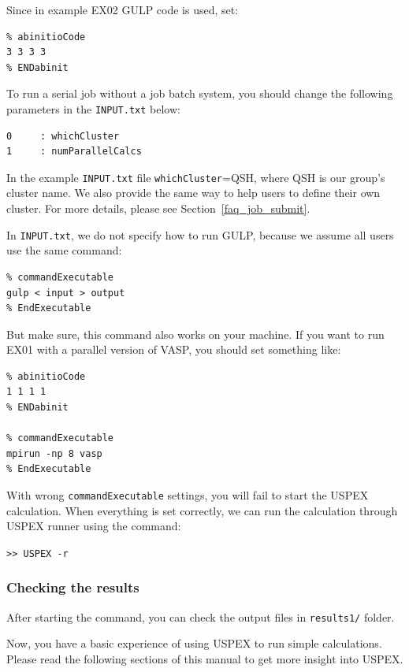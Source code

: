 \documentclass[12pt]{article}
\newcommand{\keyword}[1]{\texttt{#1}}
\newcommand{\file}[1]{\texttt{#1}}
\begin{document}
Since in example EX02 GULP code is used, set: 
{\small\begin{verbatim}
% abinitioCode
3 3 3 3
% ENDabinit
\end{verbatim} }

To run a serial job without a job batch system, you should change the following
parameters in the \file{INPUT.txt} below:
{\small\begin{verbatim}
0     : whichCluster 
1     : numParallelCalcs
\end{verbatim} }

In the example \file{INPUT.txt} file \keyword{whichCluster}=QSH, where QSH is
our group's cluster name. We also provide the same way to help users to define
their own cluster. For more details, please see Section~\ref{faq_job_submit}.

In \file{INPUT.txt}, we do not specify how to run GULP, because we assume all
users use the same command:

{\small \begin{verbatim}
% commandExecutable
gulp < input > output
% EndExecutable
\end{verbatim} }

But make sure, this command also works on your machine. If you want to run EX01
with a parallel version of VASP, you should set something like:

{\small\begin{verbatim}
% abinitioCode
1 1 1 1
% ENDabinit

% commandExecutable
mpirun -np 8 vasp
% EndExecutable
\end{verbatim}}

With wrong \keyword{commandExecutable} settings, you will fail to start the
USPEX calculation. When everything is set correctly, we can run the calculation
through USPEX runner using the command:
 
\texttt{>> USPEX -r}


\subsubsection{Checking the results}
After starting the command, you can check the output files in \file{results1/}
folder.

Now, you have a basic experience of using USPEX to run simple calculations.
Please read the following sections of this manual to get more insight into
USPEX.

\end{document}
